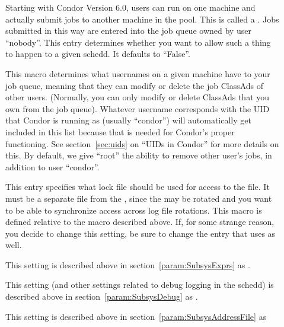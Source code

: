 \begin{description}
\item[] \label{param:AllowRemoteSubmit}
  Starting with Condor Version 6.0, users can run  on
  one machine and actually submit jobs to another machine in the
  pool.  This is called a .  Jobs submitted in
  this way are entered into the job queue owned by user ``nobody''.
  This entry determines whether you want to allow such a thing to
  happen to a given schedd.  It defaults to ``False''.
     
\item[] \label{param:QueueSuperUsers} This
  macro determines what usernames on a given machine have
   to your job queue, meaning that they can
  modify or delete the job ClassAds of other users.  (Normally, you
  can only modify or delete ClassAds that you own from the job queue).
  Whatever username corresponds with the UID that Condor is running as
  (usually ``condor'') will automatically get included in this list
  because that is needed for Condor's proper functioning.  See
  section~\ref{sec:uids} on ``UIDs in Condor'' for more details on
  this.  By default, we give ``root'' the ability to remove other
  user's jobs, in addition to user ``condor''.
      
\item[] \label{param:ScheddLock} This entry
  specifies what lock file should be used for access to the
   file.  It must be a separate file from the
  , since the  may be rotated and you
  want to be able to synchronize access across log file rotations.
  This macro is defined relative to the  macro described
  above.  If, for some strange reason, you decide to change this
  setting, be sure to change the  entry that
   uses as well.

\item[] \label{param:ScheddExprs} This setting is
  described above in section~\ref{param:SubsysExprs} as
  .

\item[] \label{param:ScheddDebug} This setting
  (and other settings related to debug logging in the schedd) is
  described above in section~\ref{param:SubsysDebug} as
  .

\item[] \label{param:ScheddAddressFile}
  This setting is described above in
  section~\ref{param:SubsysAddressFile} as


\end{description}

